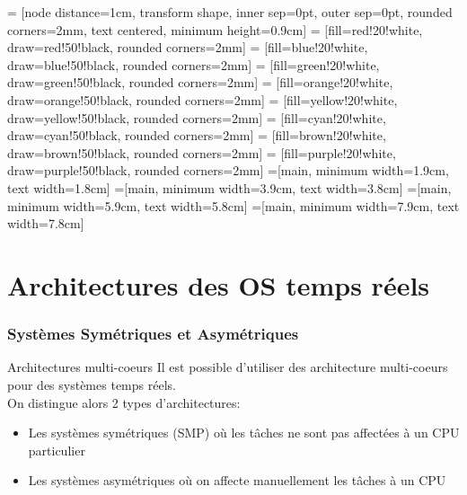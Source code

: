 %
%
%

     = [node distance=1cm, transform shape, inner sep=0pt, outer sep=0pt, rounded corners=2mm, text centered, minimum height=0.9cm]
     = [fill=red!20!white,     draw=red!50!black,     rounded corners=2mm]
    = [fill=blue!20!white,    draw=blue!50!black,    rounded corners=2mm]
   = [fill=green!20!white,   draw=green!50!black,   rounded corners=2mm]
  = [fill=orange!20!white,  draw=orange!50!black,  rounded corners=2mm]
  = [fill=yellow!20!white,  draw=yellow!50!black,  rounded corners=2mm]
    = [fill=cyan!20!white,    draw=cyan!50!black,    rounded corners=2mm]
   = [fill=brown!20!white,   draw=brown!50!black,   rounded corners=2mm]
  = [fill=purple!20!white,  draw=purple!50!black,  rounded corners=2mm]
=[main, minimum width=1.9cm, text width=1.8cm]
=[main, minimum width=3.9cm, text width=3.8cm]
=[main, minimum width=5.9cm, text width=5.8cm]
=[main, minimum width=7.9cm, text width=7.8cm]

\part{Architectures des OS temps réels}

\begin{frame}
\partpage
\end{frame}

\begin{frame}
\tableofcontents[currentpart]
\end{frame}

\section{Systèmes Symétriques et Asymétriques}

\begin{frame}{Architectures multi-coeurs}
  Il est  possible d'utiliser  des architecture multi-coeurs  pour des
  systèmes temps réels.
  \\
  On distingue alors 2 types d'architectures:
  \begin{itemize}
  \item  Les systèmes  symétriques (SMP)  où  les tâches  ne sont  pas
    affectées à un CPU particulier
  \item  Les  systèmes asymétriques  où  on  affecte manuellement  les
    tâches à un CPU
  \end{itemize}
\end{frame}

